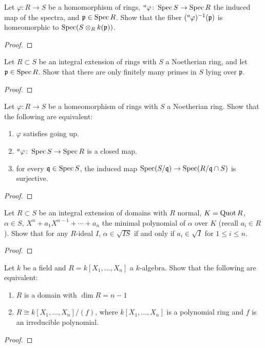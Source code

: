 \begin{problem}
Let $\varphi\colon R\to S$ be a homomorphism of rings,
$\prescript{a}{}{\varphi}\colon \operatorname{Spec} S\to\operatorname{Spec} R$ the induced map of the
spectra, and $\mathfrak{p}\in\operatorname{Spec} R$. Show that the fiber
$(\prescript{a}{}{\varphi})^{-1}(\mathfrak{p})$ is homeomorphic to
$\operatorname{Spec}(S\otimes_R k(\mathfrak{p}))$.
\end{problem}
\begin{proof}
\end{proof}
\newpage
\begin{problem}
Let $R\subset S$ be an integral extension of rings with $S$ a Noetherian
ring, and let $\mathfrak{p}\in\operatorname{Spec} R$. Show that there are only finitely
many primes in $S$ lying over $\mathfrak{p}$.
\end{problem}
\begin{proof}
\end{proof}
\newpage
\begin{problem}
Let $\varphi\colon R\to S$ be a homeomorphism of rings with $S$ a
Noetherian ring. Show that the following are equivalent:
\begin{enumerate}[label=(\roman*)]
\item $\varphi$ satisfies going up.
\item $\prescript{a}{}\varphi\colon\operatorname{Spec} S\to\operatorname{Spec} R$ is a closed map.
\item for every $\mathfrak{q}\in\operatorname{Spec} S$, the induced map
  $\operatorname{Spec}(S/\mathfrak{q})\to\operatorname{Spec}(R/\mathfrak{q}\cap S)$ is surjective.
\end{enumerate}
\end{problem}
\begin{proof}
\end{proof}
\newpage
\begin{problem}
Let $R\subset S$ be an integral extension of domains with $R$ normal,
$K=\operatorname{Quot} R$,  $\alpha\in S$, $X^n+a_1X^{n-1}+\cdots+a_n$ the minimal
polynomial of $\alpha$ over $K$ (recall $a_i\in R$). Show that for any
$R$-ideal $I$, $\alpha\in \sqrt{IS}$ if and only if $a_i\in\sqrt{I}$ for
$1\leq i\leq n$.
\end{problem}
\begin{proof}
\end{proof}
\newpage
\begin{problem}
Let $k$ be a field and $R=k[X_1,...,X_n]$ a $k$-algebra. Show that the
following are equivalent:
\begin{enumerate}[label=(\roman*)]
\item $R$ is a domain with $\dim R=n-1$
\item $R\cong k[X_1,...,X_n]/(f)$, where $k[X_1,...,X_n]$ is a polynomial
  ring and $f$ is an irreducible polynomial.
\end{enumerate}
\end{problem}
\begin{proof}
\end{proof}

